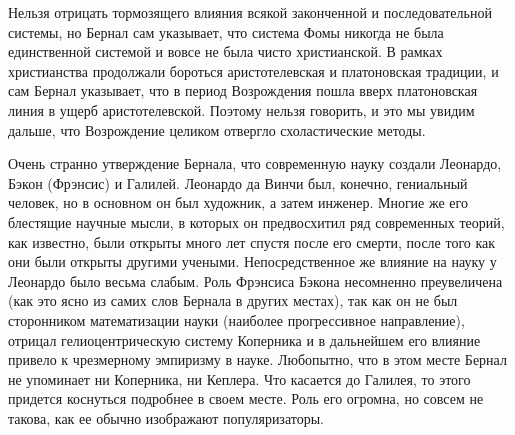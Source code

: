 Нельзя отрицать тормозящего влияния всякой законченной и
последовательной системы, но Бернал сам указывает, что система Фомы
никогда не была единственной системой и вовсе не была чисто
христианской. В рамках христианства продолжали бороться
аристотелевская и платоновская традиции, и сам Бернал указывает, что в
период Возрождения пошла вверх платоновская линия в ущерб
аристотелевской. Поэтому нельзя говорить, и это мы увидим дальше, что
Возрождение целиком отвергло схоластические методы.

Очень странно утверждение Бернала, что современную науку создали
Леонардо, Бэкон (Фрэнсис) и Галилей. Леонардо да Винчи был, конечно,
гениальный человек, но в основном он был художник, а затем инженер.
Многие же его блестящие научные мысли, в которых он предвосхитил ряд
современных теорий, как известно, были открыты много лет спустя после
его смерти, после того как они были открыты другими учеными.
Непосредственное же влияние на науку у Леонардо было весьма слабым.
Роль Фрэнсиса Бэкона несомненно преувеличена (как это ясно из самих
слов Бернала в других местах), так как он не был сторонником
математизации науки (наиболее прогрессивное направление), отрицал
гелиоцентрическую систему Коперника и в дальнейшем его влияние привело
к чрезмерному эмпиризму в науке. Любопытно, что в этом месте Бернал не
упоминает ни Коперника, ни Кеплера. Что касается до Галилея, то этого
придется коснуться подробнее в своем месте. Роль его огромна, но
совсем не такова, как ее обычно изображают популяризаторы.

